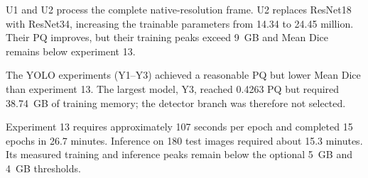 U1 and U2 process the complete native-resolution frame. U2 replaces ResNet18 with
ResNet34, increasing the trainable parameters from 14.34 to 24.45 million. Their PQ
improves, but their training peaks exceed 9~GB and Mean Dice remains below experiment
13.

The YOLO experiments (Y1--Y3) achieved a reasonable PQ but lower Mean Dice than
experiment 13. The largest model, Y3, reached 0.4263 PQ but required 38.74~GB of training
memory; the detector branch was therefore not selected.

Experiment 13 requires approximately 107 seconds per epoch and completed 15 epochs in
26.7 minutes. Inference on 180 test images required about 15.3 minutes. Its measured
training and inference peaks remain below the optional 5~GB and 4~GB thresholds.
